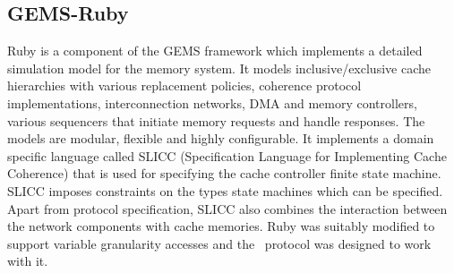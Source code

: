 \subsection{GEMS-Ruby}

Ruby is a component of the GEMS framework which implements a detailed simulation model for the memory system.  It models inclusive/exclusive cache hierarchies with various replacement policies, coherence protocol implementations, interconnection networks, DMA and memory controllers, various sequencers that initiate memory requests and handle responses. The models are modular, flexible and highly configurable. It implements a domain specific language called SLICC (Specification Language for Implementing Cache Coherence) that is used for specifying the cache controller finite state machine. SLICC imposes constraints on the types state machines which can be specified. Apart from protocol specification, SLICC also combines the interaction between the network components with cache memories. Ruby was suitably modified to support variable granularity accesses and the \AC\ protocol was designed to work with it. 



